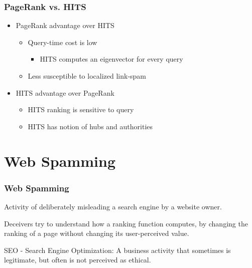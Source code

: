 \documentclass{beamer}
\begin{document}
\begin{frame}
  \frametitle{PageRank vs. HITS}

  \begin{itemize}
  \item PageRank advantage over HITS
    \begin{itemize}
    \item Query-time cost is low
      \begin{itemize}
      \item HITS computes an eigenvector for every query
      \end{itemize}
    \item Less susceptible to localized link-spam
    \end{itemize}
  \item HITS advantage over PageRank
    \begin{itemize}
    \item HITS ranking is sensitive to query
    \item HITS has notion of hubs and authorities
    \end{itemize}
  \end{itemize}

\end{frame}

\section{Web Spamming}



\begin{frame}   \frametitle{Web Spamming}

Activity of deliberately misleading a search engine by a website owner.

Deceivers try to understand how a ranking function computes, by
changing the ranking of a page without changing its user-perceived
value.

\begin{block}{SEO - Search Engine Optimization:} 
A business activity that sometimes
is legitimate, but often is not perceived as ethical.
\end{block}

\end{frame}
\end{document}
